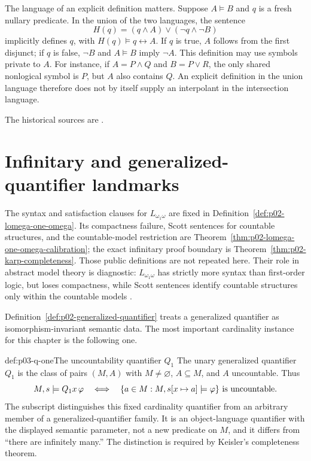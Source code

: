 The language of an explicit definition matters.  Suppose \(A\models B\)
and \(q\) is a fresh nullary predicate.  In the union of the two
languages, the sentence
\[
 H(q)=(q\land A)\lor(\neg q\land\neg B)
\]
implicitly defines \(q\), with \(H(q)\models q\leftrightarrow A\).
If \(q\) is true, \(A\) follows from the first disjunct; if \(q\)
is false, \(\neg B\) and \(A\models B\) imply \(\neg A\).
This definition may use symbols private to \(A\).
For instance, if \(A=P\land Q\) and \(B=P\lor R\), the only shared
nonlogical symbol is \(P\), but \(A\) also contains \(Q\).
An explicit definition in the union language therefore does not
by itself supply an interpolant in the intersection language.

The historical sources are
\cite{Beth1953,Craig1957,RobinsonJointConsistency1956,Hodges1993}.

\section{Infinitary and generalized-quantifier landmarks}
\label{sec:p03-abstract-landmarks}

The syntax and satisfaction clauses for \(L_{\omega_1\omega}\) are fixed in
Definition~\ref{def:p02-lomega-one-omega}.  Its compactness failure, Scott
sentences for countable structures, and the countable-model restriction are
Theorem~\ref{thm:p02-lomega-one-omega-calibration}; the exact infinitary proof
boundary is Theorem~\ref{thm:p02-karp-completeness}.  Those public definitions
are not repeated here.  Their role in abstract model theory is diagnostic:
\(L_{\omega_1\omega}\) has strictly more syntax than first-order logic, but
loses compactness, while Scott sentences identify countable structures only
within the countable models \cite{Karp1964,Scott1965}.

Definition~\ref{def:p02-generalized-quantifier} treats a generalized
quantifier as isomorphism-invariant semantic data.  The most important
cardinality instance for this chapter is the following one.

\begin{hbdefinition}{def:p03-q-one}{The uncountability quantifier \(Q_1\)}
The unary generalized quantifier \(Q_1\) is the class of pairs \((M,A)\) with
\(M\ne\varnothing\), \(A\subseteq M\), and \(A\) uncountable.  Thus
\[
 M,s\models Q_1x\,\varphi
 \quad\Longleftrightarrow\quad
 \{a\in M:M,s[x\mapsto a]\models\varphi\}\text{ is uncountable}.
\]
The subscript distinguishes this fixed cardinality quantifier from an
arbitrary member of a generalized-quantifier family.  It is an
object-language quantifier with the displayed semantic parameter, not a new
predicate on \(M\), and it differs from ``there are infinitely many.''  The
distinction is required by Keisler's completeness theorem.
\end{hbdefinition}

